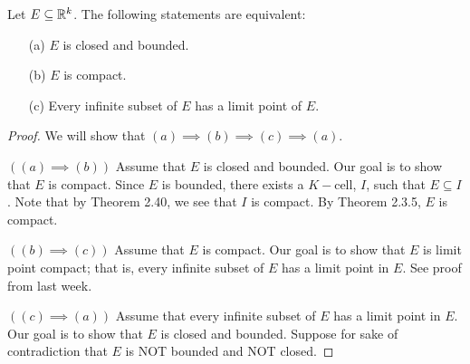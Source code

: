 \documentclass[a4paper]{report}
\begin{document}
\begin{theorem}
   Let \( E \subseteq \mathbb{R}^{k} \). The following statements are equivalent:
   \begin{enumerate}
       \item[(a)] \( E  \) is closed and bounded. 
        \item[(b)] \( E  \) is compact.
        \item[(c)] Every infinite subset of \( E  \) has a limit point of \( E  \). 
   \end{enumerate}
\end{theorem}
\begin{proof}
We will show that \( (a) \implies (b) \implies (c) \implies (a) \).

\( ((a) \implies (b) ) \) Assume that \( E  \) is closed and bounded. Our goal is to show that \( E  \) is compact. Since \( E  \) is bounded, \label{See Explanation} there exists a \( K- \)cell, \( I  \), such that \( E \subseteq I \). Note that by Theorem 2.40, we see that \( I  \) is compact. By Theorem 2.3.5, \( E  \) is compact.  

\( ((b) \implies (c)) \) Assume that \( E  \) is compact. Our goal is to show that \( E  \) is limit point compact; that is, every infinite subset of \( E  \) has a limit point in \( E  \). See proof from last week.

\( ((c) \implies (a)) \) Assume that every infinite subset of \( E  \) has a limit point in \( E  \). Our goal is to show that \( E  \) is closed and bounded. Suppose for sake of contradiction that \( E  \) is NOT bounded and NOT closed. 


\end{proof}
\end{document}
